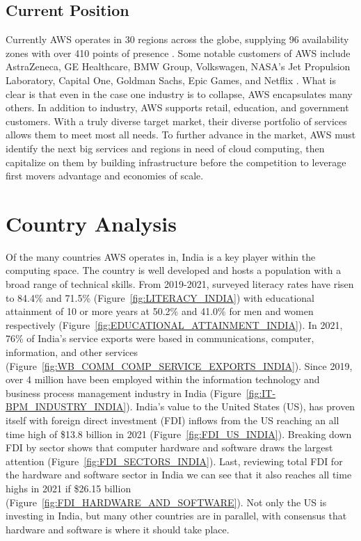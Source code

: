 \documentclass[a4paper, 12pt]{article}
\begin{document}
\subsection{Current Position}
Currently AWS operates in 30 regions across the globe, supplying 96 availability zones with over 410 points of presence \cite{AMZN_AWS_GLOBAL_INFRA}.
Some notable customers of AWS include AstraZeneca, GE Healthcare, BMW Group, Volkswagen, NASA's Jet Propulsion Laboratory, Capital One, Goldman Sachs, Epic Games, and Netflix \cite{AMZN_AWS_CLOUD_COMPUTE}. 
What is clear is that even in the case one industry is to collapse, AWS encapsulates many others. 
In addition to industry, AWS supports retail, education, and government customers. 
With a truly diverse target market, their diverse portfolio of services allows them to meet most all needs. 
To further advance in the market, AWS must identify the next big services and regions in need of cloud computing, then capitalize on them by building infrastructure before the competition to leverage first movers advantage and economies of scale. 

\section{Country Analysis}
Of the many countries AWS operates in, India is a key player within the computing space. 
The country is well developed and hosts a population with a broad range of technical skills. 
From 2019-2021, surveyed literacy rates have risen to 84.4\% and 71.5\% (Figure~\ref{fig:LITERACY_INDIA}) with educational attainment of 10 or more years at 50.2\% and 41.0\% for men and women respectively (Figure~\ref{fig:EDUCATIONAL_ATTAINMENT_INDIA}).  
In 2021, 76\% of India's service exports were based in communications, computer, information, and other services (Figure~\ref{fig:WB_COMM_COMP_SERVICE_EXPORTS_INDIA}).
Since 2019, over 4 million have been employed within the information technology and business process management industry in India (Figure~\ref{fig:IT-BPM_INDUSTRY_INDIA}). 
India's value to the United States (US), has proven itself with foreign direct investment (FDI) inflows from the US reaching an all time high of \$13.8 billion in 2021 (Figure~\ref{fig:FDI_US_INDIA}). 
Breaking down FDI by sector shows that computer hardware and software draws the largest attention (Figure~\ref{fig:FDI_SECTORS_INDIA}).
Last, reviewing total FDI for the hardware and software sector in India we can see that it also reaches all time highs in 2021 if \$26.15 billion (Figure~\ref{fig:FDI_HARDWARE_AND_SOFTWARE}). 
Not only the US is investing in India, but many other countries are in parallel, with consensus that hardware and software is where it should take place. 
\end{document}
